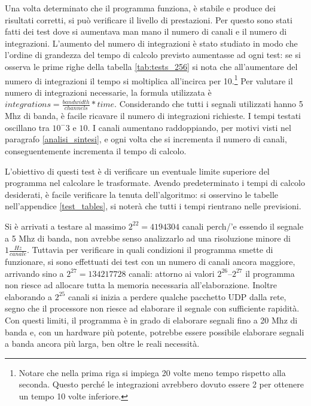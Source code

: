 Una volta determinato che il programma funziona, \`e stabile e produce dei
risultati corretti, si pu\`o verificare il livello di prestazioni. Per questo
sono stati fatti dei test dove si aumentava man mano il numero di canali e il
numero di integrazioni. L'aumento del numero di integrazioni \`e stato studiato
in modo che l'ordine di grandezza del tempo di calcolo previsto aumentasse ad
ogni test: se si osserva le prime righe della tabella \ref{tab:tests_256} si nota
che all'aumentare del numero di integrazioni il tempo si moltiplica all'incirca
per 10.\footnote{Notare che nella prima riga si impiega 20 volte meno tempo
    rispetto alla seconda. Questo perch\'e le integrazioni avrebbero dovuto
    essere 2 per ottenere un tempo 10 volte inferiore.}
Per valutare il numero di integrazioni necessarie, la formula utilizzata \`e
$integrations = \frac{bandwidth}{channels} * time$. Considerando che tutti i
segnali utilizzati hanno 5 Mhz di banda, \`e facile ricavare il numero di
integrazioni richieste. I tempi testati oscillano tra $10^-3$ e $10$.
I canali aumentano raddoppiando, per motivi visti nel paragrafo
\ref{analisi_sintesi}, e ogni volta che si incrementa il numero di canali,
conseguentemente incrementa il tempo di calcolo.

L'obiettivo di questi test \`e di verificare un eventuale limite superiore del
programma nel calcolare le trasformate. Avendo predeterminato i tempi di calcolo
desiderati, \`e facile verificare la tenuta dell'algoritmo: si osservino le
tabelle nell'appendice \ref{test_tables}, si noter\`a che tutti i tempi
rientrano nelle previsioni.

Si \`e arrivati a testare al massimo $2^22 = 4194304$ canali perch/'e essendo il
segnale a 5 Mhz di banda, non avrebbe senso analizzarlo ad una risoluzione
minore di $1 \frac{Hz}{canale}$. Tuttavia per verificare in quali condizioni il
programma smette di funzionare, si sono effettuati dei test con un numero di
canali ancora maggiore, arrivando sino a $2^27 = 134217728$ canali: attorno ai
valori $2^26$--$2^27$ il programma non riesce ad allocare tutta la memoria
necessaria all'elaborazione. Inoltre elaborando a $2^25$ canali si inizia a
perdere qualche pacchetto UDP dalla rete, segno che il processore non riesce ad
elaborare il segnale con sufficiente rapidit\`a. Con questi limiti, il programma
\`e in grado di elaborare segnali fino a 20 Mhz di banda e, con un hardware
pi\`u potente, potrebbe essere possibile elaborare segnali a banda ancora pi\`u
larga, ben oltre le reali necessit\`a.
